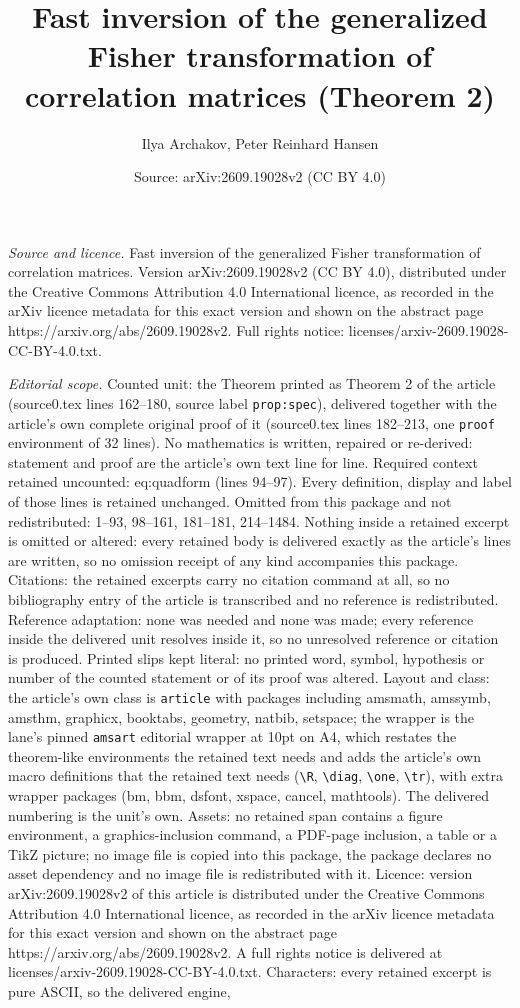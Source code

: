 \documentclass[10pt,a4paper]{amsart}
\title[Fast inversion of the generalized Fisher transformation of c]{Fast inversion of the generalized Fisher transformation of correlation matrices (Theorem 2)}
\author{Ilya Archakov, Peter Reinhard Hansen}
\date{Source: arXiv:2609.19028v2 (CC BY 4.0)}
\begin{document}
\maketitle

\noindent\emph{Source and licence.} Fast inversion of the generalized Fisher transformation of correlation matrices. Version arXiv:2609.19028v2 (CC BY 4.0), distributed under the Creative Commons Attribution 4.0 International licence, as recorded in the arXiv licence metadata for this exact version and shown on the abstract page https://arxiv.org/abs/2609.19028v2. Full rights notice: licenses/arxiv-2609.19028-CC-BY-4.0.txt.\par\smallskip

\noindent\textit{Editorial scope.} Counted unit: the Theorem printed as Theorem 2 of the article (source0.tex lines 162--180, source label \texttt{prop:spec}), delivered together with the article's own complete original proof of it (source0.tex lines 182--213, one \texttt{proof} environment of 32 lines). No mathematics is written, repaired or re-derived: statement and proof are the article's own text line for line. Required context retained uncounted: eq:quadform (lines 94--97). Every definition, display and label of those lines is retained unchanged. Omitted from this package and not redistributed: 1--93, 98--161, 181--181, 214--1484. Nothing inside a retained excerpt is omitted or altered: every retained body is delivered exactly as the article's lines are written, so no omission receipt of any kind accompanies this package. Citations: the retained excerpts carry no citation command at all, so no bibliography entry of the article is transcribed and no reference is redistributed. Reference adaptation: none was needed and none was made; every reference inside the delivered unit resolves inside it, so no unresolved reference or citation is produced. Printed slips kept literal: no printed word, symbol, hypothesis or number of the counted statement or of its proof was altered. Layout and class: the article's own class is \texttt{article} with packages including amsmath, amssymb, amsthm, graphicx, booktabs, geometry, natbib, setspace; the wrapper is the lane's pinned \texttt{amsart} editorial wrapper at 10pt on A4, which restates the theorem-like environments the retained text needs and adds the article's own macro definitions that the retained text needs (\texttt{\textbackslash R}, \texttt{\textbackslash diag}, \texttt{\textbackslash one}, \texttt{\textbackslash tr}), with extra wrapper packages (bm, bbm, dsfont, xspace, cancel, mathtools). The delivered numbering is the unit's own. Assets: no retained span contains a figure environment, a graphics-inclusion command, a PDF-page inclusion, a table or a TikZ picture; no image file is copied into this package, the package declares no asset dependency and no image file is redistributed with it. Licence: version arXiv:2609.19028v2 of this article is distributed under the Creative Commons Attribution 4.0 International licence, as recorded in the arXiv licence metadata for this exact version and shown on the abstract page https://arxiv.org/abs/2609.19028v2. A full rights notice is delivered at licenses/arxiv-2609.19028-CC-BY-4.0.txt. Characters: every retained excerpt is pure ASCII, so the delivered engine, 
\end{document}
